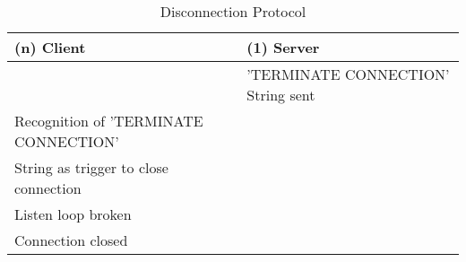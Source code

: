 \begin{table}[H]
	\centering
	\begin{tabular}{ | l | l | }
				\hline
				(n) Client & (1) Server  \\
				\hline
				&  'TERMINATE CONNECTION' String sent \\
				\hline
				Recognition of 'TERMINATE CONNECTION' & \\ 
				String as trigger to close connection & \\
				\hline 
				Listen loop broken & \\
				\hline
				Connection closed & \\
				\hline
	\end{tabular}
	\caption{Disconnection Protocol}
	\label{tab:disconnectionProtocol}
\end{table}